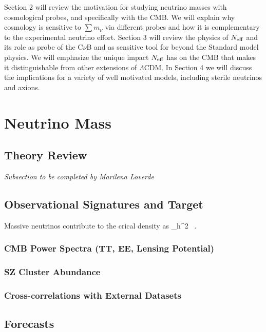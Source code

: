 Section 2 will review the motivation for studying neutrino masses with cosmological probes, and specifically with the CMB.  We will explain why cosmology is sensitive to $\sum m_\nu$ via different probes and how it is complementary to the experimental neutrino effort.  Section 3 will review the physics of $N_{\rm eff}$ and its role as probe of the C$\nu$B and as sensitive tool for beyond the Standard model physics.  We will emphasize the unique impact $N_{\rm eff}$ has on the CMB that makes it distinguishable from other extensions of $\Lambda$CDM.  In Section 4 we will discuss the implications for a variety of well motivated models, including sterile neutrinos and axions.   

\section{Neutrino Mass}

\subsection{Theory Review}

{\it Subsection to be completed by Marilena Loverde}



\subsection{Observational Signatures and Target}

Massive neutrinos contribute to the crical density as
\beq
\Omega_\nu h^2 \simeq {} \ .
\eeq

\subsubsection{CMB Power Spectra (TT, EE, Lensing Potential)}

\subsubsection{SZ Cluster Abundance}

\subsubsection{Cross-correlations with External Datasets}


\subsection{Forecasts}

